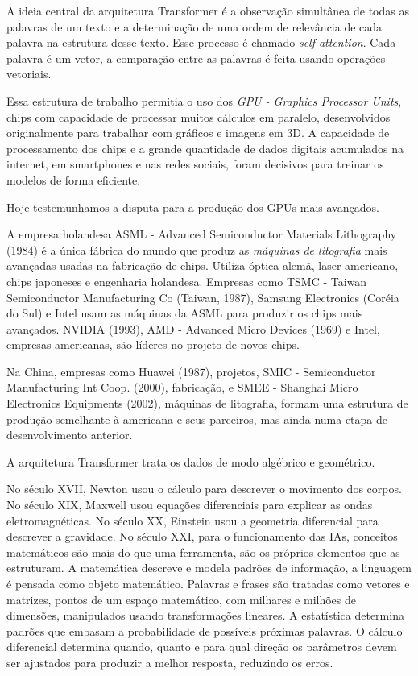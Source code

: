 \documentclass{hipatia}
\begin{document}
A ideia central da arquitetura Transformer é a observação simultânea de todas as palavras de um texto e a determinação de uma ordem de relevância de cada palavra na estrutura desse texto. Esse processo é chamado \textit{self-attention}. Cada palavra é um vetor, a comparação entre as palavras é feita usando operações vetoriais.
	
Essa estrutura de trabalho permitia o uso dos \textit{GPU - Graphics Processor Units}, chips com capacidade de processar muitos cálculos em paralelo, desenvolvidos originalmente para trabalhar com gráficos e imagens em 3D. A capacidade de processamento dos chips e a grande quantidade de dados digitais acumulados na internet, em smartphones e nas redes sociais, foram decisivos para treinar os modelos de forma eficiente.
	
Hoje testemunhamos a disputa para a produção dos GPUs mais avançados. 

A empresa holandesa ASML - Advanced Semiconductor Materials Lithography (1984) é a única fábrica do mundo que produz as \textit{máquinas de litografia} mais avançadas  usadas na fabricação de chips. Utiliza óptica alemã, laser americano, chips japoneses e engenharia holandesa. Empresas como TSMC - Taiwan Semiconductor Manufacturing Co (Taiwan, 1987), Samsung Electronics (Coréia do Sul) e Intel usam as máquinas da ASML para produzir os chips mais avançados. NVIDIA (1993), AMD - Advanced Micro Devices (1969) e Intel, empresas americanas, são líderes no projeto de novos chips.

Na China, empresas como Huawei (1987), projetos, SMIC - Semiconductor Manufacturing Int Coop. (2000), fabricação, e SMEE - Shanghai Micro Electronics Equipments (2002), máquinas de litografia, formam uma estrutura de produção semelhante à americana e seus parceiros, mas ainda numa etapa de desenvolvimento anterior.

A arquitetura Transformer trata os dados de modo algébrico e geométrico. 

No século XVII, Newton usou o cálculo para descrever o movimento dos corpos. No século XIX, Maxwell usou equações diferenciais para explicar as ondas eletromagnéticas. No século XX, Einstein usou a geometria diferencial para descrever a gravidade. No século XXI, para o funcionamento das IAs, conceitos matemáticos são mais do que uma ferramenta, são os próprios elementos que as estruturam. A matemática descreve e modela padrões de informação, a linguagem é pensada como objeto matemático. Palavras e frases são tratadas como vetores e matrizes, pontos de um espaço matemático, com milhares e milhões de dimensões, manipulados usando transformações lineares. A estatística determina padrões que embasam a probabilidade de possíveis próximas palavras. O cálculo diferencial determina quando, quanto e para qual direção os parâmetros devem ser ajustados para produzir a melhor resposta, reduzindo os erros.
\end{document}
